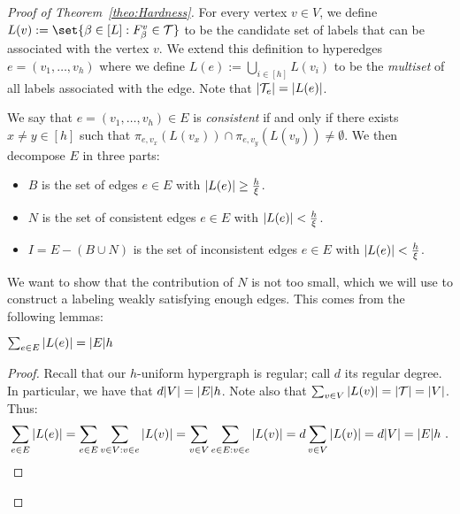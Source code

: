 \begin{proof}[Proof of Theorem~\ref{theo:Hardness}]
For every vertex $v \in V$, we define $L(v) := \set{\beta \in [L] : F_{\beta}^v \in \mathcal{T}}$ to be the candidate set of labels that can be associated with the vertex $v$. We extend this definition to hyperedges $e = (v_1,\ldots,v_h)$ where we define $L(e) := \bigcup_{i \in [h]} L(v_i)$ to be the \emph{multiset} of all labels associated with the edge. Note that $\abs{\mathcal{T}_e}=\abs{L(e)}$.

We say that $e = (v_1,\ldots,v_h) \in E$ is \emph{consistent} if and only if there exists $x \not= y \in [h]$ such that $\pi_{e,v_x}(L(v_x)) \cap \pi_{e,v_y}(L(v_y)) \not= \emptyset$. We then decompose $E$ in three parts:
\begin{itemize}
\item $B$ is the set of edges $e \in E$ with $\abs{L(e)} \geq \frac{h}{\xi}$.
\item $N$ is the set of consistent edges $e \in E$ with $\abs{L(e)} < \frac{h}{\xi}$.
\item $I = E - (B \cup N)$ is the set of inconsistent edges $e \in E$ with $\abs{L(e)} < \frac{h}{\xi}$.
\end{itemize}

We want to show that the contribution of $N$ is not too small, which we will use to construct a labeling weakly satisfying enough edges. This comes from the following lemmas:

\begin{lemma}
  $\sum_{e \in E} \abs{L(e)} = \abs{E} h$
  \label{lem:labelBound}
\end{lemma}

\begin{proof}  
  Recall that our $h$-uniform hypergraph is regular; call $d$ its regular degree. In particular, we have that $d\abs{V} = \abs{E}h$. Note also that $\sum_{v \in V} \abs{L(v)} = \abs{\mathcal{T}} = \abs{V}$. Thus:
  \[ \sum_{e \in E} \abs{L(e)} = \sum_{e \in E} \sum_{v \in V : v \in e} \abs{L(v)} = \sum_{v \in V} \sum_{e \in E: v \in e} \abs{L(v)} = d \sum_{v \in V} \abs{L(v)} = d \abs{V} = \abs{E}h\ .\]
  \end{proof}


\end{proof}
